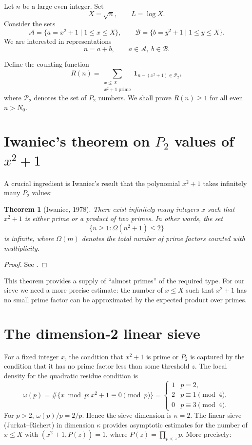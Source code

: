 \documentclass[11pt,a4paper]{article}
\newtheorem{theorem}{Theorem}[section]
\begin{document}
Let \(n\) be a large even integer. Set
\[
X = \sqrt{n},\qquad L = \log X.
\]
Consider the sets
\[
\mathcal{A} = \{ a = x^{2}+1 \mid 1\le x\le X \},\qquad
\mathcal{B} = \{ b = y^{2}+1 \mid 1\le y\le X \}.
\]
We are interested in representations
\[
n = a+b,\qquad a\in\mathcal{A},\; b\in\mathcal{B}.
\]

Define the counting function
\[
R(n) = \sum_{\substack{x\le X \\ x^{2}+1\text{ prime}}} \mathbf{1}_{n-(x^{2}+1)\in\mathcal{P}_{2}},
\]
where \(\mathcal{P}_{2}\) denotes the set of \(P_{2}\) numbers. We shall prove \(R(n)\ge 1\) for all even \(n>N_{0}\).

\section{Iwaniec's theorem on \(P_{2}\) values of \(x^{2}+1\)}

A crucial ingredient is Iwaniec's result that the polynomial \(x^{2}+1\) takes infinitely many \(P_{2}\) values:

\begin{theorem}[Iwaniec, 1978]
\label{thm:iwaniec}
There exist infinitely many integers \(x\) such that \(x^{2}+1\) is either prime or a product of two primes. In other words, the set
\[
\{ n\ge 1 : \Omega(n^{2}+1)\le 2 \}
\]
is infinite, where \(\Omega(m)\) denotes the total number of prime factors counted with multiplicity.
\end{theorem}
\begin{proof}
See \cite{iwaniec1978}.
\end{proof}

This theorem provides a supply of “almost primes” of the required type. For our sieve we need a more precise estimate: the number of \(x\le X\) such that \(x^{2}+1\) has no small prime factor can be approximated by the expected product over primes.

\section{The dimension‑2 linear sieve}

For a fixed integer \(x\), the condition that \(x^{2}+1\) is prime or \(P_{2}\) is captured by the condition that it has no prime factor less than some threshold \(z\). The local density for the quadratic residue condition is
\[
\omega(p) = \#\{ x\bmod p : x^{2}+1\equiv 0\pmod p \} =
\begin{cases}
1 & p=2,\\
2 & p\equiv 1\pmod 4,\\
0 & p\equiv 3\pmod 4.
\end{cases}
\]
For \(p>2\), \(\omega(p)/p = 2/p\). Hence the sieve dimension is \(\kappa = 2\). The linear sieve (Jurkat–Richert) in dimension \(\kappa\) provides asymptotic estimates for the number of \(x\le X\) with \((x^{2}+1, P(z))=1\), where \(P(z)=\prod_{p<z}p\). More precisely:
\end{document}
